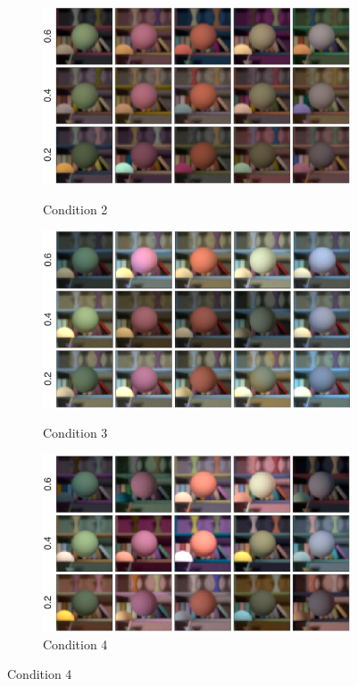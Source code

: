 \documentclass{jov}
\begin{document}
\begin{figure}
\centering
	\begin{subfigure}[b]{0.33 \textwidth}
		\caption{Condition 2}
		\includegraphics[width=\textwidth]{../FiguresDraft4/Figure2/Figure2_a.png}
 		\label{fig:backgroundVarying}
	\end{subfigure}
	\begin{subfigure}[b]{0.33 \textwidth}
        \caption{Condition 3}	
        \includegraphics[width=\textwidth]{../FiguresDraft4/Figure2/Figure2_b.png}
        \label{fig:targetIlluminantVarying}
    \end{subfigure}
	\begin{subfigure}[b]{0.33 \textwidth}
	\caption{Condition 4}	
        \includegraphics[width=\textwidth]{../FiguresDraft4/Figure2/Figure2_c.png}        

\end{subfigure}
\end{figure}
\end{document}
